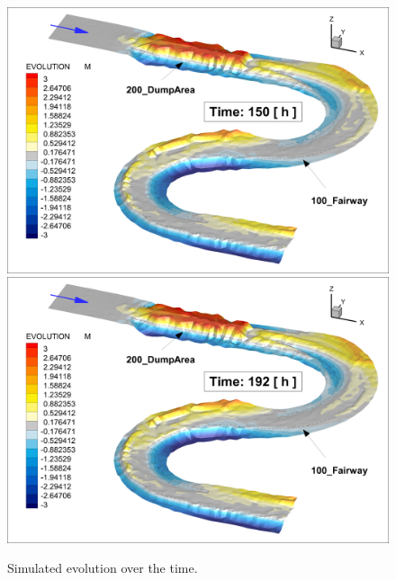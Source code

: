 \begin{figure} [!h]
	\centering
	\includegraphics[scale=0.14]{../img/critDig_Poly_150h.png}
	\includegraphics[scale=0.14]{../img/critDig_Poly_192h.png}
	\caption{Simulated evolution over the time.}\label{result56}
\end{figure}


